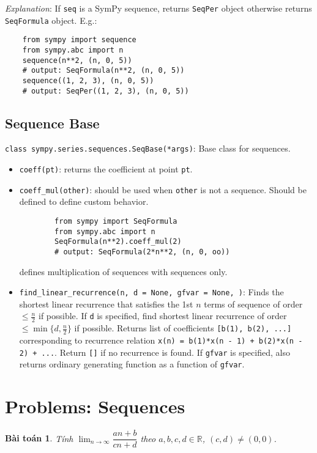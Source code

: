 \documentclass[oneside]{book}
\newtheorem{baitoan}{Bài toán}
\begin{document}
{\it Explanation}: If {\tt seq} is a SymPy sequence, returns {\tt SeqPer} object otherwise returns {\tt SeqFormula} object. E.g.:
\begin{verbatim}
	from sympy import sequence
	from sympy.abc import n
	sequence(n**2, (n, 0, 5))
	# output: SeqFormula(n**2, (n, 0, 5))
	sequence((1, 2, 3), (n, 0, 5))
	# output: SeqPer((1, 2, 3), (n, 0, 5))
\end{verbatim}


\subsection{Sequence Base}
{\tt class sympy.series.sequences.SeqBase(*args)}: Base class for sequences.
\begin{itemize}
	\item {\tt coeff(pt)}: returns the coefficient at point {\tt pt}.
	\item \verb|coeff_mul(other)|: should be used when {\tt other} is not a sequence. Should be defined to define custom behavior.
	\begin{verbatim}
		from sympy import SeqFormula			
		from sympy.abc import n			
		SeqFormula(n**2).coeff_mul(2)
		# output: SeqFormula(2*n**2, (n, 0, oo))
	\end{verbatim}
	{\tt*} defines multiplication of sequences with sequences only.
	\item \verb|find_linear_recurrence(n, d = None, gfvar = None, )|: Finds the shortest linear recurrence that satisfies the 1st $n$ terms of sequence of order $\le\frac{n}{2}$ if possible. If {\tt d} is specified, find shortest linear recurrence of order $\le\min\{d,\frac{n}{2}\}$ if possible. Returns list of coefficients {\tt[b(1), b(2), ...]} corresponding to recurrence relation {\tt x(n) = b(1)*x(n - 1) + b(2)*x(n - 2) + ...}. Return {\tt[]} if no recurrence is found. If {\tt gfvar} is specified, also returns ordinary generating function as a function of {\tt gfvar}.
\end{itemize}


\section{Problems: Sequences}

\begin{baitoan}
	Tính $\lim_{n\to\infty} \dfrac{an + b}{cn + d}$ theo $a,b,c,d\in\mathbb{R}$, $(c,d)\ne(0,0)$.
\end{baitoan}
\end{document}
